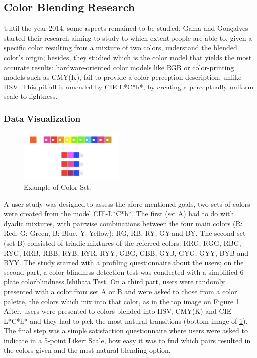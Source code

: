 \documentclass{report}
\begin{document}
\subsection{Color Blending Research}
Until the year 2014, some aspects remained to be studied. Gama and Gonçalves started their research \cite{Gama20141}
aiming to study to which extent people are able to, given a specific color resulting from a mixture of
two colors, understand the blended color’s origin; besides, they studied which is the color model that
yields the most accurate results: hardware-oriented color models like RGB or color-printing models such
as CMY(K), fail to provide a color perception description, unlike HSV. This pitfall is amended by CIE-L*C*h*,
by creating a perceptually uniform scale to lightness.  \par
%
\subsubsection{Data Visualization}
%
\begin{figure}
	\centering
    \vspace{-\baselineskip}
    \includegraphics[width=0.45\textwidth]{TestDataVis.png}
    \caption[Color Blending for Data Visualization]{Example of Color Set. \protect\cite{Gama20141}}
    \label{fig:datavis}
\end{figure}
%
A user-study was designed \cite{Gama20141} to assess the afore mentioned goals, two sets of colors were created from the model CIE-L*C*h*. The first (set A) had
to do with dyadic mixtures, with pairwise combinations between the four main colors (R: Red, G: Green, B: Blue,
Y: Yellow): RG, RB, RY, GY and BY. The second set (set B) consisted of triadic mixtures of the referred colors:
RRG, RGG, RBG, RYG, RRB, RBB, RYB, RYR, RYY, GBG, GBB, GYB, GYG, GYY, BYB and BYY. The study started with a
profiling questionnaire about the users; on the second part, a color blindness detection test was conducted
with a simplified 6-plate colorblindness Ishihara Test. On a third part, users were randomly
presented with a color from set A or B and were asked to chose from a color palette, the colors which mix
into that color, as in the top image on Figure \ref{fig:datavis}. After, users were presented to colors blended
into HSV, CMY(K) and CIE-L*C*h* and they had to pick the most natural transitions (bottom image of \ref{fig:datavis}).
The final step was a simple satisfaction questionnaire where users were asked to indicate in a 5-point Likert Scale,
how easy it was to find which pairs resulted in the colors given and the most natural blending option. \par
\end{document}
